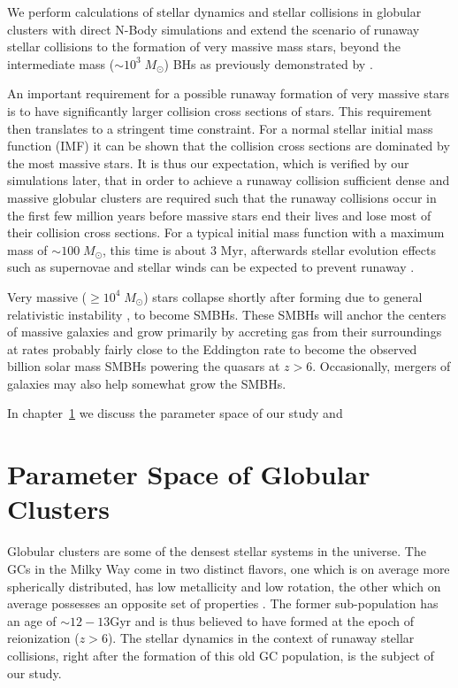 \documentclass{princeton_astro_thesis}
\newcommand\Msun{\; M_\odot}
\newcommand\msun{\; M_\odot}
\newcommand\Myr{\mbox{ Myr}}
\numberwithin{equation}{section}
\begin{document}
We perform calculations of stellar dynamics and stellar collisions in globular clusters with direct N-Body simulations 
and extend the scenario of runaway stellar collisions to 
the formation of very massive mass stars, beyond the intermediate mass ($\sim 10^3\msun$) BHs 
as previously demonstrated by \citet{2004SPZ}.

An important requirement for a possible runaway formation of very massive stars
is to have significantly larger collision cross sections of stars.
This requirement then translates to 
a stringent time constraint.
For a normal stellar initial mass function (IMF)
it can be shown that the collision cross sections are dominated by the most massive stars.
It is thus our expectation, which is verified by our simulations later,
that in order to achieve a runaway collision sufficient dense and massive globular clusters
are required such that the runaway collisions occur in the first few million years before
massive stars end their lives and lose most of their collision cross sections.
For a typical initial mass function with a maximum mass of $\sim100 \Msun$, this time is about $3 \Myr$, 
afterwards stellar evolution effects such as supernovae and stellar winds can be expected to prevent runaway \citep{2002SPZ}. 

Very massive ($\ge 10^4\msun$) stars collapse shortly after forming due to general relativistic instability \citep{1964Chandrasekhar},
to become SMBHs.
These SMBHs will anchor the centers of massive galaxies 
and grow primarily by accreting gas from their surroundings at rates probably fairly close to the Eddington rate
to become the observed billion solar mass SMBHs powering the quasars at $z>6$.
Occasionally, mergers of galaxies may also help somewhat grow the SMBHs.

In chapter~\ref{ch:Model} we discuss the parameter space of our study and 

\chapter{Parameter Space of Globular Clusters}
\label{ch:Model}

Globular clusters are some of the densest stellar systems in the universe. 
The GCs in the Milky Way come in two distinct flavors,
one which is on average more spherically distributed, has low metallicity 
and low rotation, the other which on average possesses an opposite set of properties
\citep[][]{1985Zinn}.
The former sub-population has an age of $\sim 12-13$Gyr and is thus believed
to have formed at the epoch of reionization ($z>6$).
The stellar dynamics in the context of runaway stellar collisions,
right after the formation of this old GC population, is the subject of our study.
\end{document}
